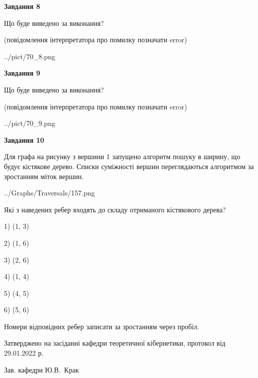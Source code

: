 \documentclass[12pt, ukrainian]{article}
\begin{document}
{\begin {large}
{\begin {center}\textbf{Завдання 8}\end {center}}\par
Що буде виведено за виконання?\par
 (повідомлення інтерпретатора про помилку позначати error)\par
\begin{center}
	{../pict/70_8.png}
\end{center}
\newpage

{\begin {center}\textbf{Завдання 9}\end {center}}\par
Що буде виведено за виконання?\par
 (повідомлення інтерпретатора про помилку позначати error)\par
\begin{center}
	{../pict/70_9.png}
\end{center}
\newpage

{\begin {center}\textbf{Завдання 10}\end {center}}\par
Для графа на рисунку з вершини 1 запущено алгоритм пошуку в ширину, що будує кістякове дерево. Списки суміжності вершин переглядаються алгоритмом за зростанням міток вершин.\par
\begin{center}
	{../Graphs/Traversals/157.png}
\end{center}
\par Які з наведених ребер входять до складу отриманого кістякового дерева?\par
1) (1, 3)\par
2) (1, 6)\par
3) (2, 6)\par
4) (1, 4)\par
5) (4, 5)\par
6) (5, 6)\par
{\vskip 15pt} Номери відповідних ребер записати за зростанням через пробіл.\par
\newpage


\end {large}
}
{\smallskip \begin {small} Затверджено на засіданні кафедри теоретичної кібернетики, протокол  від   29.01.2022 р.\par\smallskip\smallskip
{\parbox {6.5 cm}{Зав. кафедри \dotfill Ю.В.~Крак}} \end{small}}
\end{document}
